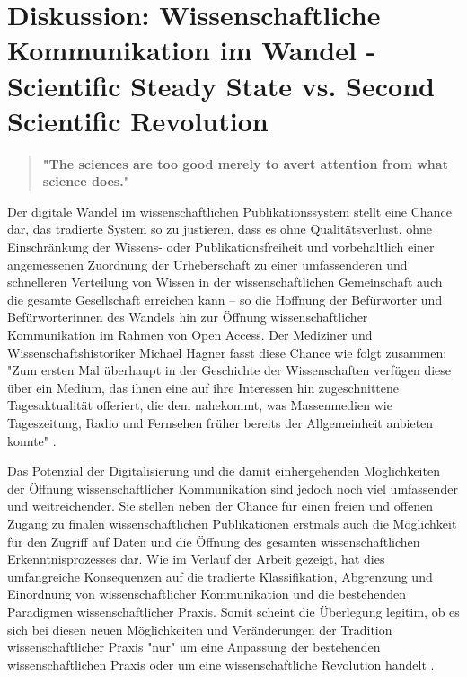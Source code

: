 \chapter{Diskussion: Wissenschaftliche Kommunikation im Wandel - Scientific Steady State vs. Second Scientific Revolution}

\begin{quote}
\textbf{"The sciences are too good merely to avert attention from what science does."}
\end{quote} \cite{kittler_2004}

Der digitale Wandel im wissenschaftlichen Publikationssystem stellt eine Chance dar, das tradierte System so zu justieren, dass es ohne Qualitätsverlust, ohne Einschränkung der Wissens- oder Publikationsfreiheit und vorbehaltlich einer angemessenen Zuordnung der Urheberschaft zu einer umfassenderen und schnelleren Verteilung von Wissen in der wissenschaftlichen Gemeinschaft auch die gesamte Gesellschaft erreichen kann – so die Hoffnung der Befürworter und Befürworterinnen des Wandels hin zur Öffnung wissenschaftlicher Kommunikation im Rahmen von Open Access. Der Mediziner und Wissenschaftshistoriker Michael Hagner fasst diese Chance wie folgt zusammen: "Zum ersten Mal überhaupt in der Geschichte der Wissenschaften verfügen diese über ein Medium, das ihnen eine auf ihre Interessen hin zugeschnittene Tagesaktualität offeriert, die dem nahekommt, was Massenmedien wie Tageszeitung, Radio und Fernsehen früher bereits der Allgemeinheit anbieten konnte" \cite{hagner_2015_sache_buches}.

Das Potenzial der Digitalisierung und die damit einhergehenden Möglichkeiten der Öffnung wissenschaftlicher Kommunikation sind jedoch noch viel umfassender und weitreichender. Sie stellen neben der Chance für einen freien und offenen Zugang zu finalen wissenschaftlichen Publikationen erstmals auch die Möglichkeit für den Zugriff auf Daten und die Öffnung des gesamten wissenschaftlichen Erkenntnisprozesses dar. Wie im Verlauf der Arbeit gezeigt, hat dies umfangreiche Konsequenzen auf die tradierte Klassifikation, Abgrenzung und Einordnung von wissenschaftlicher Kommunikation und die bestehenden Paradigmen wissenschaftlicher Praxis. Somit scheint die Überlegung legitim, ob es sich bei diesen neuen Möglichkeiten und Veränderungen der Tradition wissenschaftlicher Praxis "nur" um eine Anpassung der bestehenden wissenschaftlichen Praxis oder um eine wissenschaftliche Revolution handelt \cite{kuhn2012structure}.

